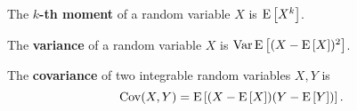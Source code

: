 \begin{definition}
    The \textbf{$k$-th moment} of a random variable $X$ is $\operatorname{E}\left[ {X^k} \right]$. 
\end{definition}

\begin{definition}
    The \textbf{variance} of a random variable $X$ is $\operatorname{Var}\operatorname{E}\left[ {(X - \operatorname{E}\left[ {X} \right])^2} \right]$.
\end{definition}

\begin{definition}
    The \textbf{covariance} of two integrable random variables $X,Y$ is 
    \begin{equation*}
        \operatorname{Cov}(X,Y) = \operatorname{E}\left[ {(X - \operatorname{E}\left[ {X} \right])(Y - \operatorname{E}\left[ {Y} \right])} \right]. 
    \end{equation*}
\end{definition}